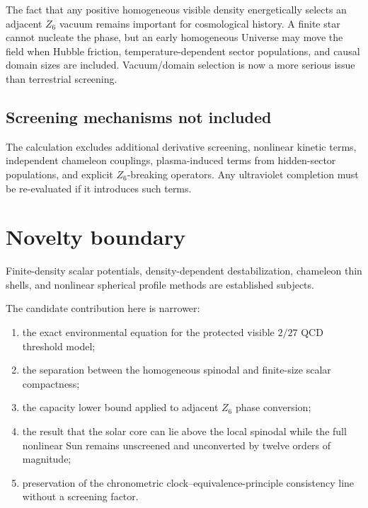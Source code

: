 \documentclass[11pt,a4paper]{article}
\providecommand{\tightlist}{\setlength{\itemsep}{0pt}\setlength{\parskip}{0pt}}
\begin{document}
The fact that any positive homogeneous visible density energetically
selects an adjacent \(Z_6\) vacuum remains important for cosmological
history. A finite star cannot nucleate the phase, but an early
homogeneous Universe may move the field when Hubble friction,
temperature-dependent sector populations, and causal domain sizes are
included. Vacuum/domain selection is now a more serious issue than
terrestrial screening.

\subsection{Screening mechanisms not
included}\label{screening-mechanisms-not-included}

The calculation excludes additional derivative screening, nonlinear
kinetic terms, independent chameleon couplings, plasma-induced terms
from hidden-sector populations, and explicit \(Z_6\)-breaking operators.
Any ultraviolet completion must be re-evaluated if it introduces such
terms.



\section{Novelty boundary}\label{novelty-boundary}

Finite-density scalar potentials, density-dependent destabilization,
chameleon thin shells, and nonlinear spherical profile methods are
established subjects.

The candidate contribution here is narrower:

\begin{enumerate}
\def\labelenumi{\arabic{enumi}.}
\tightlist
\item
  the exact environmental equation for the protected visible \(2/27\)
  QCD threshold model;
\item
  the separation between the homogeneous spinodal and finite-size scalar
  compactness;
\item
  the capacity lower bound applied to adjacent \(Z_6\) phase conversion;
\item
  the result that the solar core can lie above the local spinodal while
  the full nonlinear Sun remains unscreened and unconverted by twelve
  orders of magnitude;
\item
  preservation of the chronometric clock--equivalence-principle
  consistency line without a screening factor.
\end{enumerate}
\end{document}
